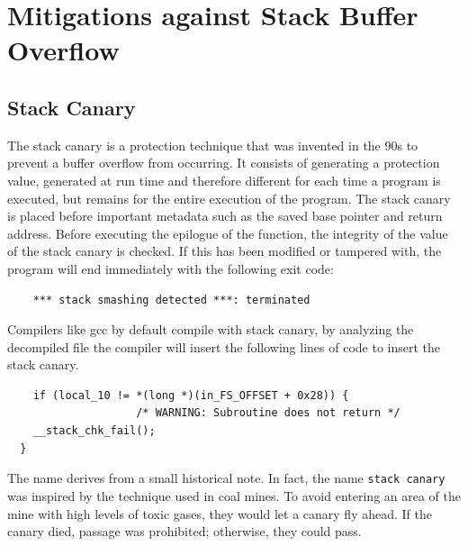    \clearpage
    \section{Mitigations against Stack Buffer Overflow}
    \subsection{Stack Canary}
    The stack canary is a protection technique that was invented in the 90s to prevent a buffer overflow from occurring.\newline
    It consists of generating a protection value, generated at run time and therefore different for each time a program is executed, but remains for the entire execution of the program.\newline
    The stack canary is placed before important metadata such as the saved base pointer and return address.\newline
    Before executing the epilogue of the function, the integrity of the value of the stack canary is checked.\newline
    If this has been modified or tampered with, the program will end immediately with the following exit code:
    \begin{verbatim}
    *** stack smashing detected ***: terminated
    \end{verbatim}
    Compilers like gcc by default compile with stack canary, by analyzing the decompiled file the compiler will insert the following lines of code to insert the stack canary.\newline
    \begin{verbatim}
    if (local_10 != *(long *)(in_FS_OFFSET + 0x28)) {
                    /* WARNING: Subroutine does not return */
    __stack_chk_fail();
  }
    \end{verbatim}
    
    The name derives from a small historical note. In fact, the name \texttt{stack canary} was inspired by the technique used in coal mines.\newline
    To avoid entering an area of the mine with high levels of toxic gases, they would let a canary fly ahead.\newline
    If the canary died, passage was prohibited; otherwise, they could pass.
    \clearpage
    
